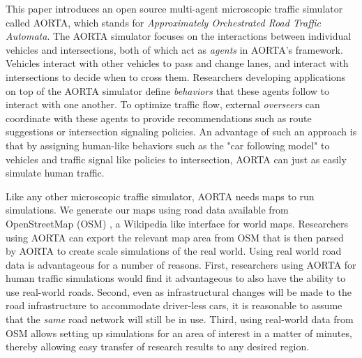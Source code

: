 \documentclass[letterpaper, 10 pt, conference]{ieeeconf}  %
\begin{document}
This paper introduces an open source multi-agent microscopic traffic simulator called AORTA, which stands for \textit{Approximately Orchestrated Road Traffic Automata}. The AORTA simulator focuses on the interactions between individual vehicles and intersections, both of which act as \textit{agents} in AORTA's framework. Vehicles interact with other vehicles to pass and change lanes, and interact with intersections to decide when to cross them. Researchers developing applications on top of the AORTA simulator define \textit{behaviors} that these agents follow to interact with one another. To optimize traffic flow, external \textit{overseers} can coordinate with these agents to provide recommendations such as route suggestions or intersection signaling policies. An advantage of such an approach is that by assigning human-like behaviors such as the "car following model" \cite{brackstone1999car} to vehicles and traffic signal like policies to intersection, AORTA can just as easily simulate human traffic.

Like any other microscopic traffic simulator, AORTA needs maps to run simulations. We generate our maps using road data available from OpenStreetMap (OSM) \cite{osm}, a Wikipedia like interface for world maps. Researchers using AORTA can export the relevant map area from OSM that is then parsed by AORTA to create scale simulations of the real world. Using real world road data is advantageous for a number of reasons. First, researchers using AORTA for human traffic simulations would find it advantageous to also have the ability to use real-world roads. Second, even as infrastructural changes will be made to the road infrastructure to accommodate driver-less cars, it is reasonable to assume that the \textit{same} road network will still be in use. Third, using real-world data from OSM allows setting up simulations for an area of interest in a matter of minutes, thereby allowing easy transfer of research results to any desired region.


\end{document}
